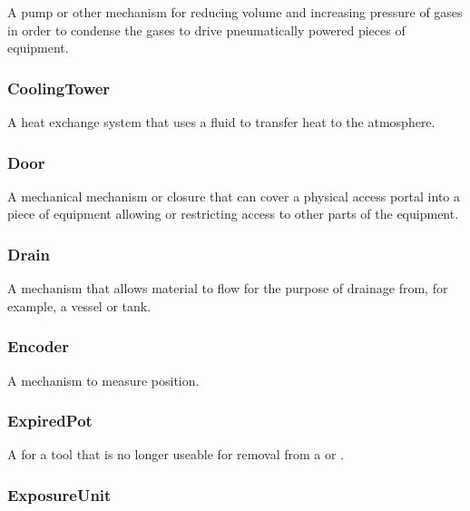 A pump or other mechanism for reducing volume and increasing pressure of gases in order to condense the gases to drive pneumatically powered pieces of equipment.


\subsubsection{CoolingTower}
\label{sec:CoolingTower}



A heat exchange system that uses a fluid to transfer heat to the atmosphere.


\subsubsection{Door}




A mechanical mechanism or closure that can cover a physical access portal into a piece of equipment allowing or restricting access to other parts of the equipment.


\subsubsection{Drain}
\label{sec:Drain}



A mechanism that allows material to flow for the purpose of drainage from, for example, a vessel or tank.


\subsubsection{Encoder}
\label{sec:Encoder}



A mechanism to measure position.


\subsubsection{ExpiredPot}
\label{sec:ExpiredPot}



A  for a tool that is no longer useable for removal from a  or .


\subsubsection{ExposureUnit}
\label{sec:ExposureUnit}



